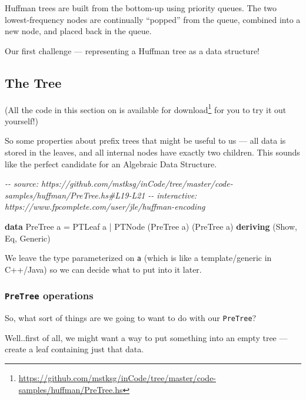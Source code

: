 \documentclass[]{article}
\newenvironment{Shaded}{}{}
\newcommand{\CommentTok}[1]{\textcolor[rgb]{0.38,0.63,0.69}{\textit{#1}}}
\newcommand{\DataTypeTok}[1]{\textcolor[rgb]{0.56,0.13,0.00}{#1}}
\newcommand{\KeywordTok}[1]{\textcolor[rgb]{0.00,0.44,0.13}{\textbf{#1}}}
\newcommand{\NormalTok}[1]{#1}
\newcommand{\OperatorTok}[1]{\textcolor[rgb]{0.40,0.40,0.40}{#1}}
\newcommand{\OtherTok}[1]{\textcolor[rgb]{0.00,0.44,0.13}{#1}}
\renewcommand{\href}[2]{#2\footnote{\url{#1}}}
\begin{document}
Huffman trees are built from the bottom-up using priority queues. The two
lowest-frequency nodes are continually ``popped'' from the queue, combined into
a new node, and placed back in the queue.

Our first challenge --- representing a Huffman tree as a data structure!

\subsection{The Tree}\label{the-tree}

(All the code in this section on is
\href{https://github.com/mstksg/inCode/tree/master/code-samples/huffman/PreTree.hs}{available
for download} for you to try it out yourself!)

So some properties about prefix trees that might be useful to us --- all data is
stored in the leaves, and all internal nodes have exactly two children. This
sounds like the perfect candidate for an Algebraic Data Structure.

\begin{Shaded}
\begin{Highlighting}[]
\CommentTok{{-}{-} source: https://github.com/mstksg/inCode/tree/master/code{-}samples/huffman/PreTree.hs\#L19{-}L21}
\CommentTok{{-}{-} interactive: https://www.fpcomplete.com/user/jle/huffman{-}encoding}

\KeywordTok{data} \DataTypeTok{PreTree}\NormalTok{ a }\OtherTok{=} \DataTypeTok{PTLeaf}\NormalTok{ a}
               \OperatorTok{|} \DataTypeTok{PTNode}\NormalTok{ (}\DataTypeTok{PreTree}\NormalTok{ a) (}\DataTypeTok{PreTree}\NormalTok{ a)}
               \KeywordTok{deriving}\NormalTok{ (}\DataTypeTok{Show}\NormalTok{, }\DataTypeTok{Eq}\NormalTok{, }\DataTypeTok{Generic}\NormalTok{)}
\end{Highlighting}
\end{Shaded}

We leave the type parameterized on \texttt{a} (which is like a template/generic
in C++/Java) so we can decide what to put into it later.

\subsubsection{\texorpdfstring{\texttt{PreTree}
operations}{PreTree operations}}\label{pretree-operations}

So, what sort of things are we going to want to do with our \texttt{PreTree}?

Well..first of all, we might want a way to put something into an empty tree ---
create a leaf containing just that data.
\end{document}
